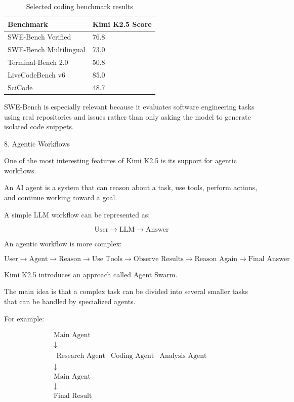 \documentclass{article}
\begin{document}
\begin{table}[h]
\centering
\begin{tabular}{ll}
\hline
Benchmark & Kimi K2.5 Score \\
\hline
SWE-Bench Verified & 76.8 \\
SWE-Bench Multilingual & 73.0 \\
Terminal-Bench 2.0 & 50.8 \\
LiveCodeBench v6 & 85.0 \\
SciCode & 48.7 \\
\hline
\end{tabular}
\caption{Selected coding benchmark results}
\end{table}

SWE-Bench is especially relevant because it evaluates software engineering tasks using real repositories and issues rather than only asking the model to generate isolated code snippets.

8. Agentic Workflows

One of the most interesting features of Kimi K2.5 is its support for agentic workflows.

An AI agent is a system that can reason about a task, use tools, perform actions, and continue working toward a goal.

A simple LLM workflow can be represented as:

\[
\text{User}
\rightarrow
\text{LLM}
\rightarrow
\text{Answer}
\]

An agentic workflow is more complex:

\[
\text{User}
\rightarrow
\text{Agent}
\rightarrow
\text{Reason}
\rightarrow
\text{Use Tools}
\rightarrow
\text{Observe Results}
\rightarrow
\text{Reason Again}
\rightarrow
\text{Final Answer}
\]

Kimi K2.5 introduces an approach called Agent Swarm.

The main idea is that a complex task can be divided into several smaller tasks that can be handled by specialized agents.

For example:

\[
\begin{array}{c}
\text{Main Agent} \\
\downarrow \\
\begin{array}{ccc}
\text{Research Agent} &
\text{Coding Agent} &
\text{Analysis Agent}
\end{array} \\
\downarrow \\
\text{Main Agent} \\
\downarrow \\
\text{Final Result}
\end{array}
\]
\end{document}
